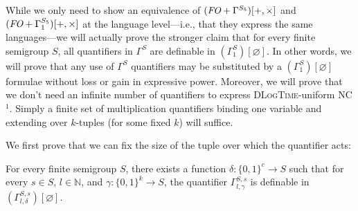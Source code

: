 \documentclass[a4paper,UKenglish,cleveref, autoref, thm-restate, anonymous]{lipics-v2021}
\begin{document}
While we only need to show an equivalence of $(\emph{FO} + \Gamma^{S_5})[+,\times]$ and $(\emph{FO} + \Gamma^{S_5}_1)[+,\times]$ at the language level---i.e., that they express the same languages---we will actually prove the stronger claim that for every finite semigroup $S$, all quantifiers in $\Gamma^{S}$ are definable in $(\Gamma^S_1)[\varnothing]$. In other words, we will prove that any use of $\Gamma^{S}$ quantifiers may be substituted by a $(\Gamma^S_1)[\varnothing]$ formulae without loss or gain in expressive power. Moreover, we will prove that we don't need an infinite number of quantifiers to express \textsc{DLogTime}-uniform NC${}^1$. Simply a finite set of multiplication quantifiers binding one variable and extending over $k$-tuples (for some fixed $k$) will suffice.

We first prove that we can fix the size of the tuple over which the quantifier acts:

\begin{lemma}\label{lem:finitetuple}
    For every finite semigroup $S$, there exists a function $\delta : \{0,1\}^c \rightarrow S$ such that for every $s \in S$, $l \in \mathbb{N}$, and $\gamma : \{0,1\}^k \rightarrow S$, the quantifier $\Gamma^{S,s}_{l,\gamma}$ is definable in $(\Gamma^{S,s}_{l,\delta})[\varnothing]$.
\end{lemma}
\end{document}
